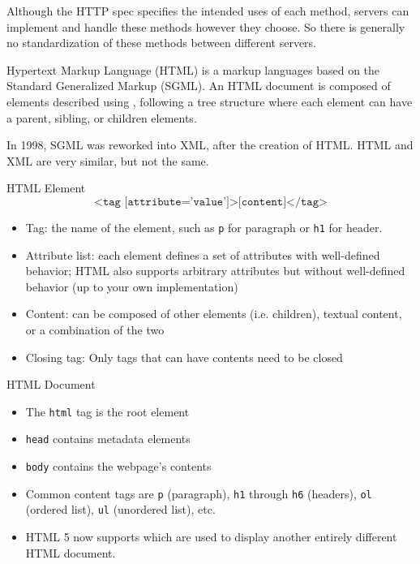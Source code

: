 Although the HTTP spec specifies the intended uses of each method, servers can implement and handle these methods however they choose. So there is generally no standardization of these methods between different servers.

\begin{dfnbox}{Hypertext Markup Language (HTML)}{}
     is a markup languages based on the Standard Generalized Markup (SGML). An HTML document is composed of elements described using , following a tree structure where each element can have a parent, sibling, or children elements.
\end{dfnbox}

In 1998, SGML was reworked into XML, after the creation of HTML. HTML and XML are very similar, but not the same.

\begin{dfnbox}{HTML Element}{}
    \[ \texttt{<tag [attribute='value']>[content]</tag>} \]
    \begin{itemize}
        \item Tag: the name of the element, such as \texttt{p} for paragraph or \texttt{h1} for header.
        \item Attribute list: each element defines a set of attributes with well-defined behavior; HTML also supports arbitrary attributes but without well-defined behavior (up to your own implementation)
        \item Content: can be composed of other elements (i.e. children), textual content, or a combination of the two
        \item Closing tag: Only tags that can have contents need to be closed
    \end{itemize}
\end{dfnbox}

\begin{exbox}{HTML Document}{}
    \begin{itemize}
        \item The \texttt{html} tag is the root element
        \item \texttt{head} contains metadata elements
        \item \texttt{body} contains the webpage's contents
        \item Common content tags are \texttt{p} (paragraph), \texttt{h1} through \texttt{h6} (headers), \texttt{ol} (ordered list), \texttt{ul} (unordered list), etc.
        \item HTML 5 now supports  which are used to display another entirely different HTML document.
    \end{itemize}
\end{exbox}

